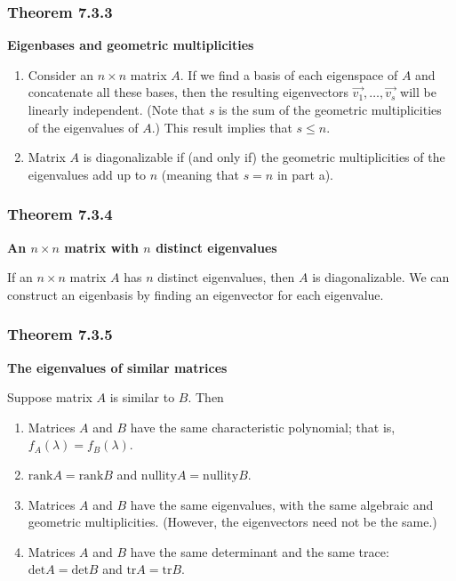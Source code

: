 \documentclass{report}
\begin{document}
\subsubsection*{Theorem 7.3.3}
\par\noindent\textbf{Eigenbases and geometric multiplicities}
\renewcommand{\labelenumi}{\textbf{\alph{enumi}.}}
\begin{enumerate}
\item Consider an $n\times{}n$ matrix $A$. If we find a basis of each eigenspace of $A$ and concatenate all these bases, then the resulting eigenvectors $\vec{v_{1}},\ldots{},\vec{v_{s}}$ will be linearly independent. (Note that $s$ is the sum of the geometric multiplicities of the eigenvalues of $A$.) This result implies that $s\le{}n$.
\item Matrix $A$ is diagonalizable if (and only if) the geometric multiplicities of the eigenvalues add up to $n$ (meaning that $s=n$ in part a).
\end{enumerate}
\subsubsection*{Theorem 7.3.4}
\par\noindent\textbf{An $n\times{}n$ matrix with $n$ distinct eigenvalues}
\par\noindent If an $n\times{}n$ matrix $A$ has $n$ distinct eigenvalues, then $A$ is diagonalizable. We can construct an eigenbasis by finding an eigenvector for each eigenvalue.
\subsubsection*{Theorem 7.3.5}
\par\noindent\textbf{The eigenvalues of similar matrices}
\par\noindent Suppose matrix $A$ is similar to $B$. Then
\renewcommand{\labelenumi}{\textbf{\alph{enumi}.}}
\begin{enumerate}
\item Matrices $A$ and $B$ have the same characteristic polynomial; that is, $f_{A}(\lambda)=f_{B}(\lambda{})$.
\item $\textrm{rank}A=\textrm{rank}B$ and $\textrm{nullity}A=\textrm{nullity}B$.
\item Matrices $A$ and $B$ have the same eigenvalues, with the same algebraic and geometric multiplicities. (However, the eigenvectors need not be the same.)
\item Matrices $A$ and $B$ have the same determinant and the same trace: $\textrm{det}A=\textrm{det}B$ and $\textrm{tr}A=\textrm{tr}B$.
\end{enumerate}
\end{document}
